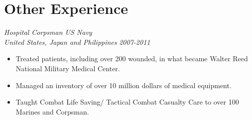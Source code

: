 \documentclass[letterpaper]{article}
\begin{document}
\vspace{.05in}
\section*{Other Experience}
\begin{multicols}{2}
\textit{Hospital Corpsman US Navy
\\United States, Japan and Philippines}
\vfill
\columnbreak
\textit{2007-2011}
\end{multicols}
\begin{itemize}
    \item Treated patients, including over 200 wounded, in what became Walter Reed National Military Medical Center.
    \item Managed an inventory of over 10 million dollars of medical equipment.
    \item Taught Combat Life Saving/ Tactical Combat Casualty Care to over 100 Marines and Corpsman. 
\end{itemize}

\end{document}

